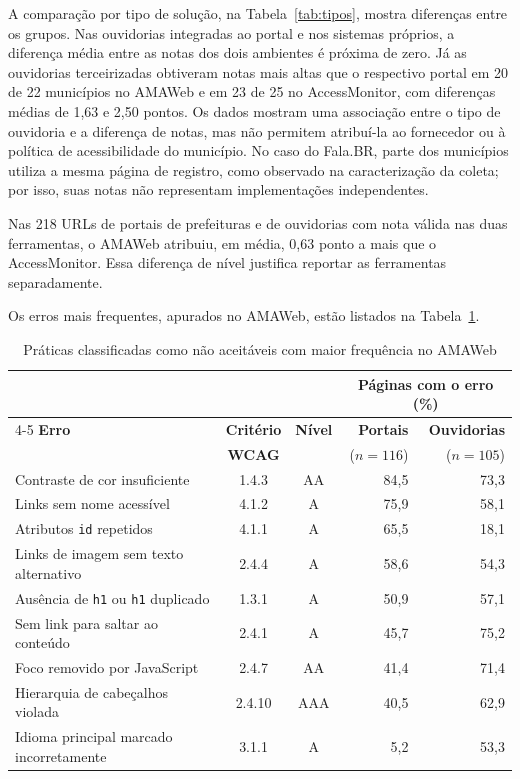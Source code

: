 \documentclass[12pt]{article}
\begin{document}
A comparação por tipo de solução, na Tabela~\ref{tab:tipos}, mostra diferenças entre os grupos. Nas ouvidorias integradas ao portal e nos sistemas próprios, a diferença média entre as notas dos dois ambientes é próxima de zero. Já as ouvidorias terceirizadas obtiveram notas mais altas que o respectivo portal em 20 de 22 municípios no AMAWeb e em 23 de 25 no AccessMonitor, com diferenças médias de 1,63 e 2,50 pontos. Os dados mostram uma associação entre o tipo de ouvidoria e a diferença de notas, mas não permitem atribuí-la ao fornecedor ou à política de acessibilidade do município. No caso do Fala.BR, parte dos municípios utiliza a mesma página de registro, como observado na caracterização da coleta; por isso, suas notas não representam implementações independentes.

Nas 218 URLs de portais de prefeituras e de ouvidorias com nota válida nas duas ferramentas, o AMAWeb atribuiu, em média, 0,63 ponto a mais que o AccessMonitor. Essa diferença de nível justifica reportar as ferramentas separadamente.

Os erros mais frequentes, apurados no AMAWeb, estão listados na Tabela~\ref{tab:erros_portais}.

\begin{table}[H]
\centering
\caption{Práticas classificadas como não aceitáveis com maior frequência no AMAWeb}
\label{tab:erros_portais}
\small
\begin{tabular}{lccrr}
\toprule
 & & & \multicolumn{2}{c}{\textbf{Páginas com o erro (\%)}} \\
\cmidrule(lr){4-5}
\textbf{Erro} & \textbf{Critério} & \textbf{Nível} & \textbf{Portais} & \textbf{Ouvidorias} \\
 & \textbf{WCAG} & & ($n=116$) & ($n=105$) \\
\midrule
Contraste de cor insuficiente             & 1.4.3  & AA  & 84,5 & 73,3 \\
Links sem nome acessível                  & 4.1.2  & A   & 75,9 & 58,1 \\
Atributos \texttt{id} repetidos           & 4.1.1  & A   & 65,5 & 18,1 \\
Links de imagem sem texto alternativo     & 2.4.4  & A   & 58,6 & 54,3 \\
Ausência de \texttt{h1} ou \texttt{h1} duplicado & 1.3.1 & A & 50,9 & 57,1 \\
Sem link para saltar ao conteúdo          & 2.4.1  & A   & 45,7 & 75,2 \\
Foco removido por JavaScript              & 2.4.7  & AA  & 41,4 & 71,4 \\
Hierarquia de cabeçalhos violada          & 2.4.10 & AAA & 40,5 & 62,9 \\
Idioma principal marcado incorretamente   & 3.1.1  & A   &  5,2 & 53,3 \\
\bottomrule
\end{tabular}
\end{table}
\end{document}

